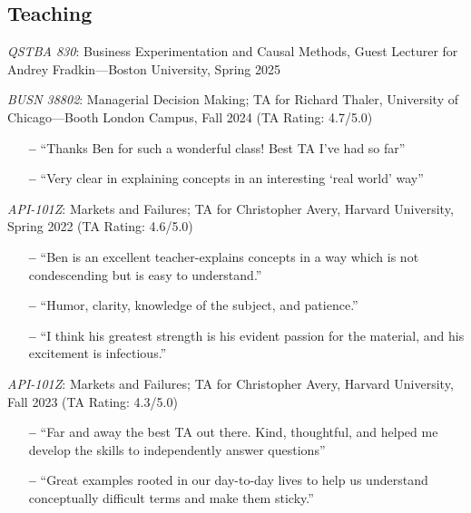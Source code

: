 \documentclass[margin,line,pifont,palatino,courier, 9pt]{res}
\begin{document}
\begin{resume}
\section{\sc Teaching}
\textit{QSTBA 830}: Business Experimentation and Causal Methods, Guest Lecturer for Andrey Fradkin---Boston University, Spring 2025

\textit{BUSN 38802}: Managerial Decision Making; TA for Richard Thaler, University of Chicago---Booth London Campus, Fall 2024 (TA Rating: 4.7/5.0)
\vspace{2mm}
\begin{itemize}\setlength{\itemsep}{0pt}
    \small
    \item[\textbf{--}] ``Thanks Ben for such a wonderful class! Best TA I've had so far''
    \item[\textbf{--}] ``Very clear in explaining concepts in an interesting `real world' way''
\end{itemize}

\textit{API-101Z}: Markets and Failures; TA for Christopher Avery, Harvard University, Spring 2022 (TA Rating: 4.6/5.0)
\vspace{2mm}
\begin{itemize}\setlength{\itemsep}{0pt}
    \small
    \item[\textbf{--}] ``Ben is an excellent teacher-explains concepts in a way which is not condescending but is easy to understand.''
    \item[\textbf{--}] ``Humor, clarity, knowledge of the subject, and patience.''
    \item[\textbf{--}] ``I think his greatest strength is his evident passion for the material, and his excitement is infectious.''
\end{itemize}

\textit{API-101Z}: Markets and Failures; TA for Christopher Avery, Harvard University, Fall 2023 (TA Rating: 4.3/5.0)
\vspace{2mm}
\begin{itemize}\setlength{\itemsep}{0pt}
    \small
    \item[\textbf{--}] ``Far and away the best TA out there. Kind, thoughtful, and helped me develop the skills to independently answer questions''
    \item[\textbf{--}] ``Great examples rooted in our day-to-day lives to help us understand conceptually difficult terms and make them sticky.''
\end{itemize}




\end{resume}
\end{document}
